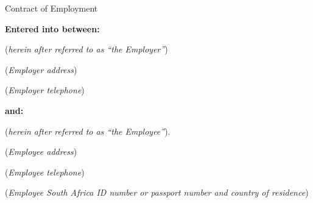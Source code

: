 \documentclass[a4paper,11pt]{article}
\begin{document}

\raggedright

\begin{center}
  {\Huge \textsf{Contract of Employment}}

  \vspace{2cm}

  \textbf{Entered into between:}

  \vspace{0.5cm}


  (\textit{herein after referred to as ``the Employer''})

  \vspace{0.5cm}



  (\textit{Employer address})

  \vspace{0.5cm}


  (\textit{Employer telephone})

  \vspace{0.5cm}

  \textbf{and:}

  \vspace{0.5cm}


  (\textit{herein after referred to as ``the Employee''}).

  \vspace{0.5cm}



  (\textit{Employee address})

  \vspace{0.5cm}


  (\textit{Employee telephone})

  \vspace{0.5cm}


  (\textit{Employee South Africa ID number or passport number and country of
  residence})

  \vspace{0.5cm}

\end{center}
\end{document}
